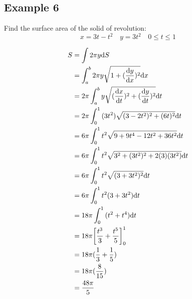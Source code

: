 \documentclass{math}
\begin{document}
\subsection*{Example 6}
Find the surface area of the solid of revolution:
\[ x = 3t-t^{2} \quad y = 3t^{2} \quad 0 \leq t \leq 1 \]
\begin{center}
\end{center}
\begin{align*}
  S &= \int{2\pi y\mathrm{d}{S}} \\
  &= \int_{a}^{b}{2\pi y\sqrt{1+(\frac{\mathrm{d}{y}}{\mathrm{d}{x}})^{2}}\mathrm{d}{x}} \\
  &= 2\pi\int_{a}^{b}{y\sqrt{(\frac{\mathrm{d}{x}}{\mathrm{d}{t}})^{2}+
    (\frac{\mathrm{d}{y}}{\mathrm{d}{t}})^{2}}\mathrm{d}{t}} \\
  &= 2\pi\int_{0}^{1}{(3t^{2})\sqrt{(3-2t^{2})^{2}+(6t)^{2}}\mathrm{d}{t}} \\
  &= 6\pi\int_{0}^{1}{t^{2}\sqrt{9+9t^{4}-12t^{2}+36t^{2}}\mathrm{d}{t}} \\
  &= 6\pi\int_{0}^{1}{t^{2}\sqrt{3^{2}+(3t^{2})^{2}+2(3)(3t^{2})}\mathrm{d}{t}} \\
  &= 6\pi\int_{0}^{1}{t^{2}\sqrt{(3+3t^{2})^{2}}\mathrm{d}{t}} \\
  &= 6\pi\int_{0}^{1}{t^{2}(3+3t^{2})\mathrm{d}{t}} \\
  &= 18\pi\int_{0}^{1}{(t^{2}+t^{4})\mathrm{d}{t}} \\
  &= 18\pi\bigg[\frac{t^{3}}{3}+\frac{t^{5}}{5}\bigg]_{0}^{1} \\
  &= 18\pi(\frac{1}{3}+\frac{1}{5}) \\
  &= 18\pi(\frac{8}{15}) \\
  &= \frac{48\pi}{5}
\end{align*}
\end{document}
